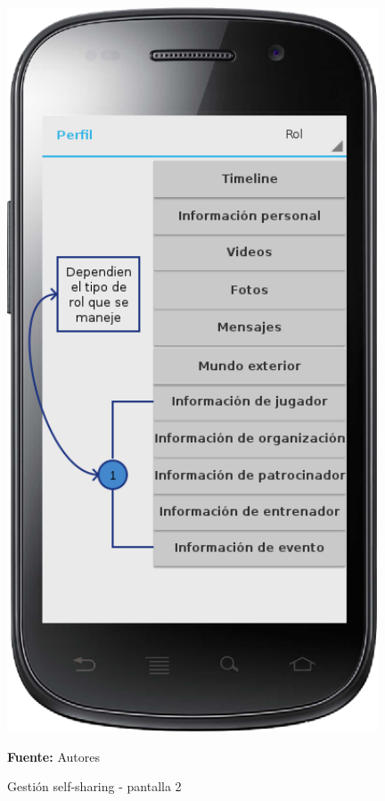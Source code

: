 \begin{figure}[!htb]
  \begin{center}
    \includegraphics[width=11cm]{./imagenes/UI/Self_sharing/self_sharing_2.png}
    \caption{Gestión self-sharing - pantalla 2}
    \label{fig:self_sharing_2}
    \textbf{Fuente:}  Autores
  \end{center}
\end{figure}

